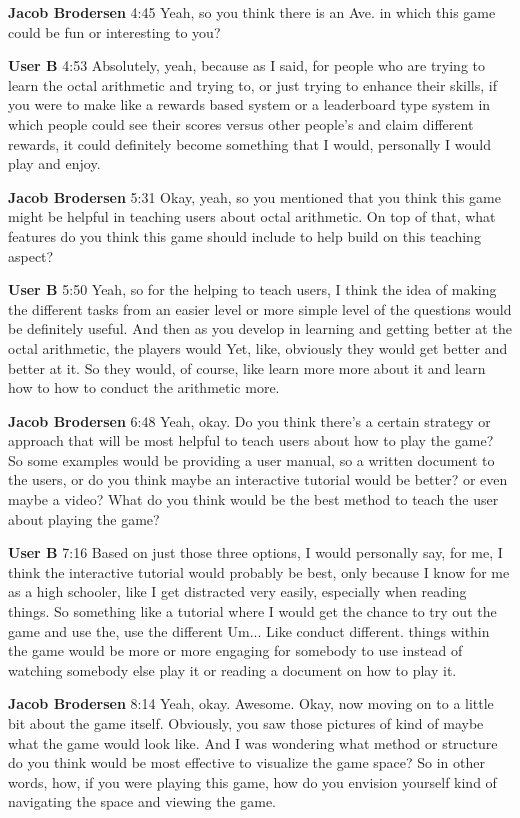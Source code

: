 \documentclass{article}
\begin{document}
\noindent \textbf{Jacob Brodersen}   4:45
Yeah, so you think there is an Ave. in which this game could be fun or interesting to you?

\noindent \textbf{User B}   4:53
Absolutely, yeah, because as I said, for people who are trying to learn the octal arithmetic and trying to, or just trying to enhance their skills, if you were to make like a rewards based system or a
leaderboard type system in which people could see their scores versus other people's and claim different rewards, it could definitely become something that I would, personally I would play and enjoy.

\noindent \textbf{Jacob Brodersen}   5:31
Okay, yeah, so you mentioned that you think this game might be helpful in teaching users about octal arithmetic. On top of that, what features do you think this game should include to help build on this teaching aspect?

\noindent \textbf{User B}   5:50
Yeah, so for the helping to teach users, I think the idea of making the different tasks from an easier level or more simple
level of the questions would be definitely useful. And then as you develop in learning and getting better at the octal arithmetic, the players would
Yet, like, obviously they would get better and better at it.
So they would, of course, like learn more more about it and learn how to how to conduct the arithmetic more.

\noindent \textbf{Jacob Brodersen}   6:48
Yeah, okay. Do you think there's a certain strategy or approach that will be most helpful to teach users about how to play the game? So some examples would be providing a user manual, so a written document to the users, or do you think maybe an interactive tutorial would be better?
or even maybe a video? What do you think would be the best method to teach the user about playing the game?

\noindent \textbf{User B}   7:16
Based on just those three options, I would personally say, for me, I think the interactive tutorial would probably be best, only because I know for me as a high schooler, like I get distracted very
easily, especially when reading things. So something like a tutorial where I would get the chance to try out the game and use the, use the different
Um...
Like conduct different.
things within the game would be more or more engaging for somebody to use instead of watching somebody else play it or reading a document on how to play it.

\noindent \textbf{Jacob Brodersen}   8:14
Yeah, okay. Awesome.
Okay, now moving on to a little bit about the game itself. Obviously, you saw those pictures of kind of maybe what the game would look like. And I was wondering what method or structure do you think would be most effective to visualize the game space? So in other words, how, if you were playing this game, how do you envision yourself kind of
navigating the space and viewing the game.
\end{document}
